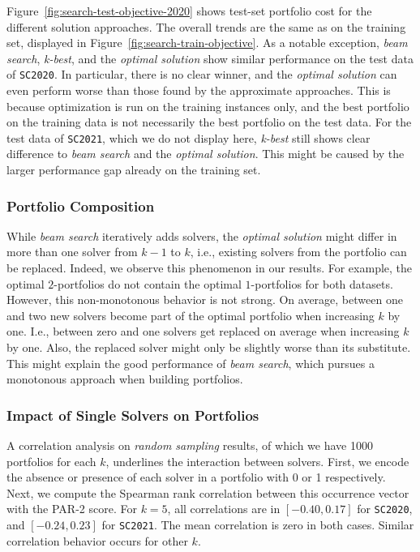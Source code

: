 \documentclass[conference]{IEEEtran}
\begin{document}
Figure~\ref{fig:search-test-objective-2020} shows test-set portfolio cost for the different solution approaches.
The overall trends are the same as on the training set, displayed in Figure~\ref{fig:search-train-objective}.
As a notable exception, \emph{beam search}, \emph{k-best}, and the \emph{optimal solution} show similar performance on the test data of \texttt{SC2020}.
In particular, there is no clear winner, and the \emph{optimal solution} can even perform worse than those found by the approximate approaches. 
This is because optimization is run on the training instances only, and the best portfolio on the training data is not necessarily the best portfolio on the test data.
For the test data of \texttt{SC2021}, which we do not display here, \emph{k-best} still shows clear difference to \emph{beam search} and the \emph{optimal solution}.
This might be caused by the larger performance gap already on the training set.

\subsubsection{Portfolio Composition}

While \emph{beam search} iteratively adds solvers, the \emph{optimal solution} might differ in more than one solver from $k-1$ to $k$, i.e., existing solvers from the portfolio can be replaced.
Indeed, we observe this phenomenon in our results.
For example, the optimal $2$-portfolios do not contain the optimal $1$-portfolios for both datasets.
However, this non-monotonous behavior is not strong.
On average, between one and two new solvers become part of the optimal portfolio when increasing $k$ by one.
I.e., between zero and one solvers get replaced on average when increasing $k$ by one.
Also, the replaced solver might only be slightly worse than its substitute.
This might explain the good performance of \emph{beam search}, which pursues a monotonous approach when building portfolios.

\subsubsection{Impact of Single Solvers on Portfolios}

A correlation analysis on \emph{random sampling} results, of which we have 1000 portfolios for each $k$, underlines the interaction between solvers.
First, we encode the absence or presence of each solver in a portfolio with 0 or 1 respectively.
Next, we compute the Spearman rank correlation between this occurrence vector with the PAR-2 score.
For $k=5$, all correlations are in $[-0.40,0.17]$ for \texttt{SC2020}, and $[-0.24,0.23]$ for \texttt{SC2021}.
The mean correlation is zero in both cases.
Similar correlation behavior occurs for other $k$.
\end{document}
